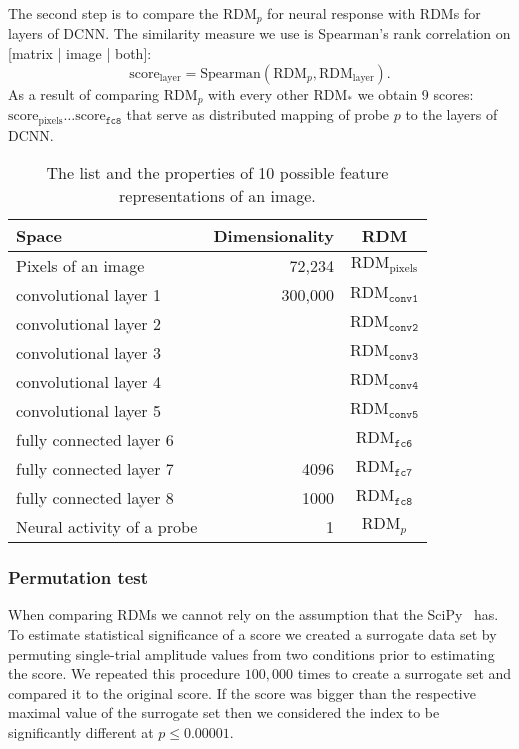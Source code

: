 \documentclass[final]{jneurosci}
\begin{document}
The second step is to compare the $\text{RDM}_p$ for neural response with RDMs for layers of DCNN. The similarity measure we use is Spearman's rank correlation on [matrix | image | both]:
$$\text{score}_\text{layer} = \text{Spearman}(\text{RDM}_p, \text{RDM}_\text{layer}).$$
As a result of comparing $\text{RDM}_p$ with every other $\text{RDM}_*$ we obtain 9 scores: $\text{score}_\text{pixels}\ldots\text{score}_\texttt{fc8}$ that serve as distributed mapping of probe $p$ to the layers of DCNN.

\begin{table}[h]
    \centering
    \begin{tabular}{l|r|c}
        \textbf{Space} & \textbf{Dimensionality} & RDM \\ \hline
        Pixels of an image & 72,234 & $\text{RDM}_\text{pixels}$ \\
        convolutional layer 1 & 300,000 & $\text{RDM}_\texttt{conv1}$ \\
        convolutional layer 2 & & $\text{RDM}_\texttt{conv2}$\\
        convolutional layer 3 & & $\text{RDM}_\texttt{conv3}$ \\
        convolutional layer 4 & & $\text{RDM}_\texttt{conv4}$ \\
        convolutional layer 5 & & $\text{RDM}_\texttt{conv5}$ \\
        fully connected layer 6 & & $\text{RDM}_\texttt{fc6}$ \\
        fully connected layer 7 & 4096 & $\text{RDM}_\texttt{fc7}$ \\
        fully connected layer 8 & 1000 & $\text{RDM}_\texttt{fc8}$ \\
        Neural activity of a probe & 1 & $\text{RDM}_p$
    \end{tabular}
    \caption{The list and the properties of 10 possible feature representations of an image.}
    \label{tab:feature-spaces}
\end{table}




\subsubsection{Permutation test}
When comparing RDMs we cannot rely on the assumption that the SciPy~\citep{scipy} has.
To estimate statistical significance of a score we created a surrogate data set by permuting single-trial amplitude values from two conditions prior to estimating the score. We repeated this procedure $100,000$ times to create a surrogate set and compared it to the original score. If the score was bigger than the respective maximal value of the surrogate set then we considered the index to be significantly different at $p \le 0.00001$.
\end{document}
